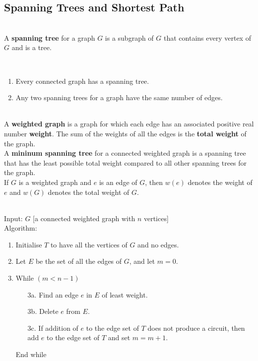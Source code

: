 \documentclass[12pt]{article}
\begin{document}
\subsection{Spanning Trees and Shortest Path}
\begin{definition}
\hfill\\
\normalfont A \textbf{spanning tree} for a graph $G$ is a subgraph of $G$ that contains every vertex of $G$ and is a tree.
\end{definition}
\begin{proposition}[10.7.1]
\hfill\\
\normalfont 
\begin{enumerate}
\item Every connected graph has a spanning tree.
\item Any two spanning trees for a graph have the same number of edges.
\end{enumerate}
\end{proposition}
\begin{definition}
\hfill\\
\normalfont A \textbf{weighted graph} is a graph for which each edge has an associated positive real number \textbf{weight}. The sum of the weights of all the edges is the \textbf{total weight} of the graph.\\
A \textbf{mininum spanning tree} for a connected weighted graph is a spanning tree that has the least possible total weight compared to all other spanning trees for the graph.\\
If $G$ is a weighted graph and $e$ is an edge of $G$, then $w(e)$ denotes the weight of $e$ and $w(G)$ denotes the total weight of $G$.
\end{definition}
\begin{algorithm}[Kruskal]
\hfill\\
\normalfont Input: $G$ [a connected weighted graph with $n$ vertices]\\
Algorithm:\\
\begin{enumerate}
\item Initialise $T$ to have all the vertices of $G$ and no edges.
\item Let $E$ be the set of all the edges of $G$, and let $m = 0$.
\item While $(m<n-1)$
\begin{itemize}
\item[3a.] Find an edge $e$ in $E$ of least weight.
\item[3b.] Delete $e$ from $E$.
\item[3c.] If addition of $e$ to the edge set of $T$ does not produce a circuit, then add $e$ to the edge set of $T$ and set $m = m +1$.
\end{itemize}
\item[] End while
\end{enumerate}
\end{algorithm}
\end{document}
